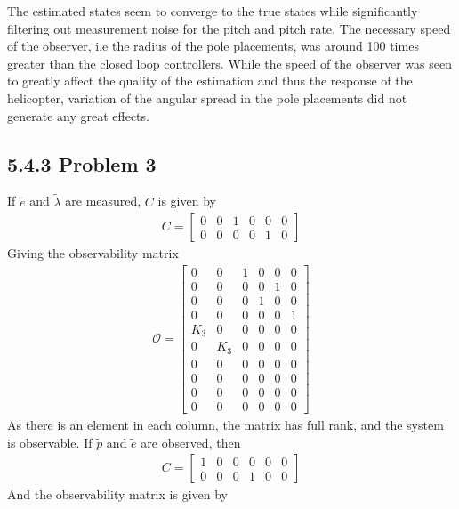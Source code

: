 The estimated states seem to converge to the true states while significantly filtering out measurement noise for the pitch and pitch rate. The necessary speed of the observer, i.e the radius of the pole placements, was around 100 times greater than the closed loop controllers. While the speed of the observer was seen to greatly affect the quality of the estimation and thus the response of the helicopter, variation of the angular spread in the pole placements did not generate any great effects.

\newpage
{}
\subsection*{5.4.3 Problem 3}
If $\tilde{e}$ and $\tilde{\lambda}$ are measured, $C$ is given by
\begin{align*}
C =
\begin{bmatrix}
    0 & 0 & 1 & 0 & 0 & 0\\
    0 & 0 & 0 & 0 & 1 & 0
\end{bmatrix}
\end{align*}
Giving the observability matrix
\begin{align*}
\mathcal{O} =
\begin{bmatrix}
    0 & 0 & 1 & 0 & 0 & 0\\
    0 & 0 & 0 & 0 & 1 & 0\\
    0 & 0 & 0 & 1 & 0 & 0\\
    0 & 0 & 0 & 0 & 0 & 1\\
    K_3 & 0 & 0 & 0 & 0 & 0\\
    0 & K_3 & 0 & 0 & 0 & 0\\
    0 & 0 & 0 & 0 & 0 & 0\\
    0 & 0 & 0 & 0 & 0 & 0\\
    0 & 0 & 0 & 0 & 0 & 0\\
    0 & 0 & 0 & 0 & 0 & 0
\end{bmatrix}
\end{align*}
As there is an element in each column, the matrix has full rank, and the system is observable. If $\tilde{p}$ and $\tilde{e}$ are observed, then
\begin{align*}
C =
\begin{bmatrix}
    1 & 0 & 0 & 0 & 0 & 0\\
    0 & 0 & 0 & 1 & 0 & 0
\end{bmatrix}
\end{align*}
And the observability matrix is given by
